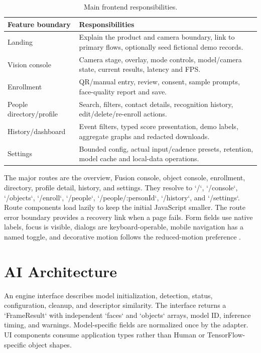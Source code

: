 \documentclass[11pt,oneside,openany]{report}
\begin{document}
\begin{table}[htbp]
\centering
\caption{Main frontend responsibilities.}
\begin{tabularx}{\textwidth}{>{\raggedright\arraybackslash}p{}X}
\toprule
\textbf{Feature boundary} & \textbf{Responsibilities} \\
\midrule
Landing & Explain the product and camera boundary, link to primary flows, optionally seed fictional demo records. \\
Vision console & Camera stage, overlay, mode controls, model/camera state, current results, latency and FPS. \\
Enrollment & QR/manual entry, review, consent, sample prompts, face-quality report and save. \\
People directory/profile & Search, filters, contact details, recognition history, edit/delete/re-enroll actions. \\
History/dashboard & Event filters, typed score presentation, demo labels, aggregate graphs and redacted downloads. \\
Settings & Bounded config, actual input/cadence presets, retention, model cache and local-data operations. \\
\bottomrule
\end{tabularx}
\end{table}

The major routes are the overview, Fusion console, object console, enrollment, directory, profile detail, history, and settings. They resolve to `/`, `/console`, `/objects`, `/enroll`, `/people`, `/people/:personId`, `/history`, and `/settings`. Route components load lazily to keep the initial JavaScript smaller. The route error boundary provides a recovery link when a page fails. Form fields use native labels, focus is visible, dialogs are keyboard-operable, mobile navigation has a named toggle, and decorative motion follows the reduced-motion preference \cite{wcag}.

\chapter{AI Architecture}
An engine interface describes model initialization, detection, status, configuration, cleanup, and descriptor similarity. The interface returns a `FrameResult` with independent `faces` and `objects` arrays, model ID, inference timing, and warnings. Model-specific fields are normalized once by the adapter. UI components consume application types rather than Human or TensorFlow-specific object shapes.
\end{document}
